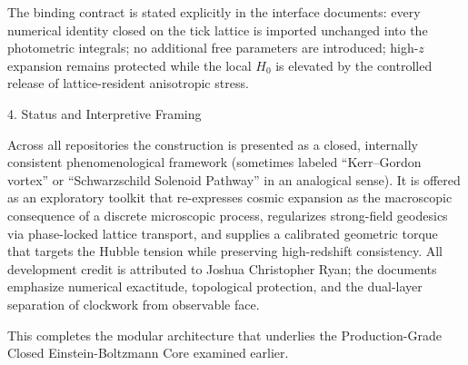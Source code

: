 The binding contract is stated explicitly in the interface documents: every numerical identity closed on the tick lattice is imported unchanged into the photometric integrals; no additional free parameters are introduced; high-\(z\) expansion remains protected while the local \(H_0\) is elevated by the controlled release of lattice-resident anisotropic stress.

4. Status and Interpretive Framing

Across all repositories the construction is presented as a closed, internally consistent phenomenological framework (sometimes labeled “Kerr–Gordon vortex” or “Schwarzschild Solenoid Pathway” in an analogical sense). It is offered as an exploratory toolkit that re-expresses cosmic expansion as the macroscopic consequence of a discrete microscopic process, regularizes strong-field geodesics via phase-locked lattice transport, and supplies a calibrated geometric torque that targets the Hubble tension while preserving high-redshift consistency. All development credit is attributed to Joshua Christopher Ryan; the documents emphasize numerical exactitude, topological protection, and the dual-layer separation of clockwork from observable face.

This completes the modular architecture that underlies the Production-Grade Closed Einstein-Boltzmann Core examined earlier.
